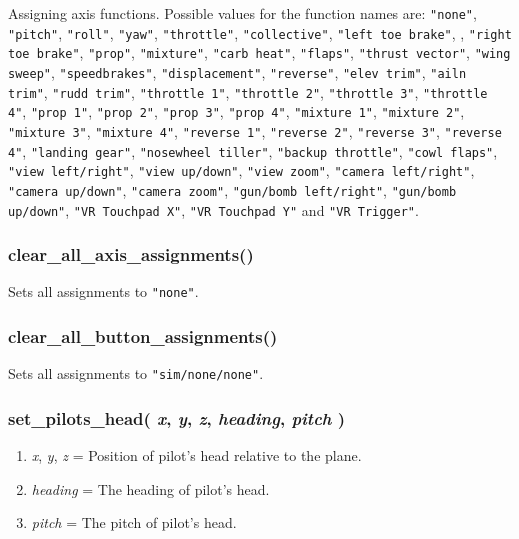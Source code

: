 \documentclass[11pt,parskip=half,a4paper]{scrartcl}
\begin{document}
Assigning axis functions. Possible values for the function names are: \verb|"none"|, \verb|"pitch"|, \verb|"roll"|, \verb|"yaw"|, \verb|"throttle"|, \verb|"collective"|, \verb|"left toe brake"|, , \verb|"right toe brake"|, \verb|"prop"|, \verb|"mixture"|, \verb|"carb heat"|, \verb|"flaps"|, \verb|"thrust vector"|, \verb|"wing sweep"|, \verb|"speedbrakes"|, \verb|"displacement"|, \verb|"reverse"|, \verb|"elev trim"|, \verb|"ailn trim"|, \verb|"rudd trim"|, \verb|"throttle 1"|, \verb|"throttle 2"|, \verb|"throttle 3"|, \verb|"throttle 4"|, \verb|"prop 1"|, \verb|"prop 2"|, \verb|"prop 3"|, \verb|"prop 4"|, \verb|"mixture 1"|, \verb|"mixture 2"|, \verb|"mixture 3"|, \verb|"mixture 4"|, \verb|"reverse 1"|, \verb|"reverse 2"|, \verb|"reverse 3"|, \verb|"reverse 4"|, \verb|"landing gear"|, \verb|"nosewheel tiller"|, \verb|"backup throttle"|, \verb|"cowl flaps"|, \verb|"view left/right"|, \verb|"view up/down"|, \verb|"view zoom"|, \verb|"camera left/right"|, \verb|"camera up/down"|, \verb|"camera zoom"|,
\verb|"gun/bomb left/right"|, \verb|"gun/bomb up/down"|, \verb|"VR Touchpad X"|, \verb|"VR Touchpad Y"| and \verb|"VR Trigger"|.
	
\subsubsection{clear\_all\_axis\_assignments()}

Sets all assignments to \verb|"none"|.

\subsubsection{clear\_all\_button\_assignments()}

Sets all assignments to \verb|"sim/none/none"|.

\subsubsection{set\_pilots\_head( \emph{x}, \emph{y}, \emph{z}, \emph{heading}, \emph{pitch} )}

\begin{enumerate}
	\item \emph{x}, \emph{y}, \emph{z} = Position of pilot's head relative to the plane.
	\item \emph{heading} = The heading of pilot's head.
	\item \emph{pitch} = The pitch of pilot's head.
\end{enumerate}
\end{document}
